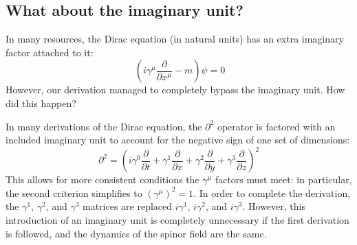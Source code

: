 \subsection*{What about the imaginary unit?}

In many resources, the Dirac equation (in natural units) has an extra imaginary factor attached to
it:
$$\
\left(i\gamma^\mu \frac{\partial}{\partial x^\mu} - m\right) \psi = 0
$$
However, our derivation managed to completely bypass the imaginary unit. How did this happen?

In many derivations of the Dirac equation, the $\partial^2$ operator is factored with an included
imaginary unit to account for the negative sign of one set of dimensions:
$$
\partial^2 = \left(i\gamma^0 \frac{\partial}{\partial t} +
\gamma^1 \frac{\partial}{\partial x} +
\gamma^2 \frac{\partial}{\partial y} +
\gamma^3 \frac{\partial}{\partial z}
\right)^2
$$
This allows for more consistent conditions the $\gamma^\mu$ factors must meet: in particular, the
second criterion simplifies to $\left(\gamma^\mu\right)^2 = 1$. In order to complete the derivation,
the $\gamma^1$, $\gamma^2$, and $\gamma^3$ matrices are replaced $i\gamma^1$, $i\gamma^2$, and
$i\gamma^3$. However, this introduction of an imaginary unit is completely unnecessary if the first
derivation is followed, and the dynamics of the spinor field are the same.
